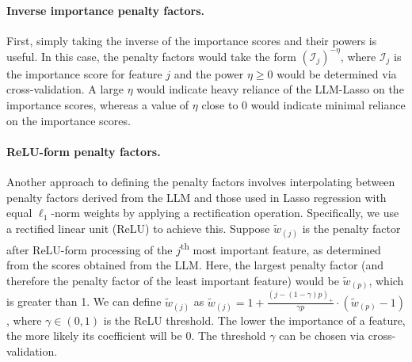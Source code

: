 \paragraph{Inverse importance penalty factors.}
First, simply taking the inverse of the importance scores and their powers is useful. In this case, the penalty factors would take the form $(\mathcal{I}_j)^{-\eta}$, where $\mathcal{I}_j$ is the importance score for feature $j$ and the power $\eta \geq 0$ would be determined via cross-validation. A large $\eta$ would indicate heavy reliance of the LLM-Lasso on the importance scores, whereas a value of $\eta$ close to 0 would indicate minimal reliance on the importance scores.%

\paragraph{ReLU-form penalty factors.}
Another approach to defining the penalty factors involves interpolating between penalty factors derived from the LLM and those used in Lasso regression with equal $\ell_1$-norm weights by applying a rectification operation. Specifically, we use a rectified linear unit (ReLU) to achieve this. Suppose $\tilde{w}_{(j)}$ is the penalty factor after ReLU-form processing of the $j$\textsuperscript{th} most important feature, as determined from the scores obtained from the LLM. Here, the largest penalty factor (and therefore the penalty factor of the least important feature) would be $\tilde{w}_{(p)}$, which is greater than 1. We can define $\tilde{w}_{(j)}$ as $\tilde{w}_{(j)} = 1 + \frac{(j - (1 - \gamma)p)_+}{\gamma p} \cdot (\tilde{w}_{(p)} - 1)$,
\noindent where $\gamma \in (0, 1)$ is the ReLU threshold. The lower the importance of a feature, the more likely its coefficient will be 0. The threshold $\gamma$ can be chosen via cross-validation. 




